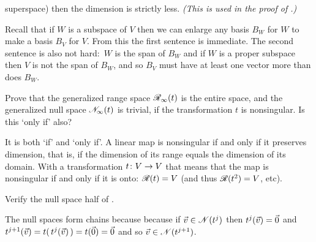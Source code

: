 \begin{exercises}
    superspace) then the dimension is strictly less.
    \textit{(This is used in the proof of
             .)}
    \begin{answer}
      Recall that if $W$ is a subspace of $V$ then we can enlarge
      any basis $B_W$ for $W$
      to make a basis $B_V$ for $V$.
      From this the first sentence is immediate.
      The second sentence is also not hard:~$W$ is the span of $B_W$ and
      if $W$ is a proper subspace then $V$ is not the span of $B_W$, and
      so $B_V$ must have at least one vector more than does $B_W$.     
    \end{answer}
  \recommended\item 
    Prove that the generalized range space $\mathscr{R}_\infty(t)$ is the
    entire space, and the generalized null space $\mathscr{N}_\infty(t)$ is trivial,
    if the transformation $t$ is nonsingular.
    Is this `only if' also?
    \begin{answer}
      It is both `if' and `only if'.
      A linear map is nonsingular
      if and only if it preserves dimension, that is, if the dimension of 
      its range equals the dimension of its domain.
      With a transformation $\mbox{$t\colon V\to V$}$ that means that 
      the map is nonsingular if and only if it is onto:
      $\mathscr{R}(t)=V$ (and thus $\mathscr{R}(t^2)=V$, etc).
    \end{answer}
  \item \label{exer:RangeAndNullChains} 
    Verify the null space half of .
    \begin{answer}
      The null spaces form chains because
      because if $\vec{v}\in\mathscr{N}(t^j)$ then $t^j(\vec{v})=\vec{0}$
      and $t^{j+1}(\vec{v})=t(\,t^j(\vec{v})\,)=t(\vec{0})=\vec{0}$ and
      so $\vec{v}\in\mathscr{N}(t^{j+1})$.


\end{answer}
\end{exercises}
